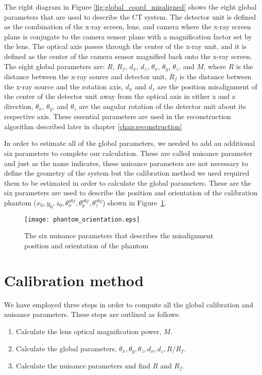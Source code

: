The right diagram in Figure \ref{fig:global_coord_misaligned} shows the eight global parameters that are used to describe the CT system.  The detector unit is defined as the combination of the x-ray screen, lens, and camera where the x-ray screen plane is conjugate to the camera sensor plane with a magnification factor set by the lens.  The optical axis passes through the center of the x-ray unit, and it is defined as the center of the camera sensor magnified back onto the x-ray screen.  The eight global parameters are: $R$, $R_f$, $d_x$, $d_z$, $\theta_x$, $\theta_y$, $\theta_z$, and $M$, where $R$ is the distance between the x-ray source and detector unit, $R_f$ is the distance between the x-ray source and the rotation axis, $d_x$ and $d_z$ are the position misalignment of the center of the detector unit away from the optical axis in either x and z direction, $\theta_x$, $\theta_y$, and $\theta_z$ are the angular rotation of the detector unit about its respective axis.  These essential parameters are used in the reconstruction algorithm described later in chapter \ref{chap:reconstruction}

In order to estimate all of the global parameters, we needed to add an additional six parameters to complete our calculation.  These are called nuisance parameter and just as the name indicates, these nuisance parameters are not necessary to define the geometry of the system but the calibration method we used required them to be estimated in order to calculate the global parameters.  These are the six parameters are used to describe the position and orientation of the calibration phantom ($x_0, y_0, z_0, \theta^{obj}_x, \theta_y^{obj}, \theta_z^{obj}$) shown in Figure~\ref{fig:phantom_orientation}.  

\begin{figure}[ht]
\centering
\texttt{[image: phantom\_orientation.eps]}
\caption{The six nuisance parameters that describes the misalignment position and orientation of the phantom}
\label{fig:phantom_orientation}
\end{figure}

\section{Calibration method}
We have employed three steps in order to compute all the global calibration and nuisance parameters.  These steps are outlined as follows:

\begin{enumerate}
\item Calculate the lens optical magnification power, $M$.
\item Calculate the global parameters, $\theta_x, \theta_y, \theta_z, d_x, d_z, R/R_f$.
\item Calculate the nuisance parameters and find $R$ and $R_f$.
\end{enumerate}

